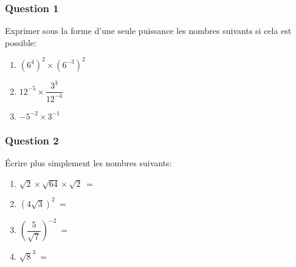 \documentclass[t,12pt]{beamer}
\begin{document}
\begin{frame}
	\frametitle{Question 1}
Exprimer sous la forme d'une seule puissance les nombres suivants si cela est possible:\bigskip
\begin{enumerate}
	\item $(6^4)^{2}\times (6^{-3})^2 $\bigskip
	\item $12^{-5}\times \dfrac{3^3}{12^{-4}}  $ \bigskip
	\item  $-5^{-2} \times 3^{-1} $
\end{enumerate}
\end{frame}

\begin{frame}
\frametitle{Question 2}
Écrire plus simplement les nombres suivants:\bigskip

\begin{enumerate}
	\item $\sqrt{2}\times \sqrt{64}\times \sqrt{2} \ = \ $\bigskip
	\item $(4\sqrt{3})^2 \ = \ $ \bigskip
	\item $\left(\dfrac{5}{\sqrt{7}}\right)^{-2} \ = \ $\bigskip
	\item $\sqrt{8}^{3} \ = \ $
\end{enumerate}

\end{frame}
\end{document}
